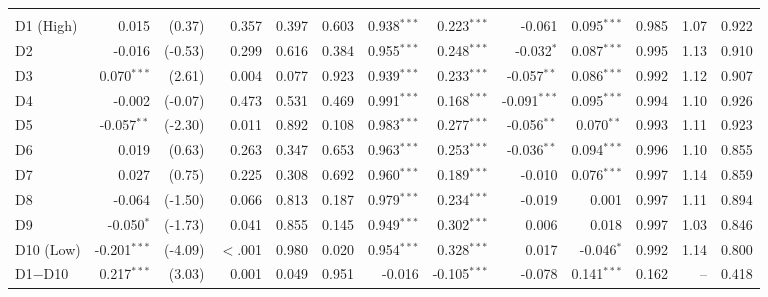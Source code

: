 {\begin{longtable}[t]{lrrrrrrrrrrrr}
\addlinespace[0.3em]
\hline
\multicolumn{13}{l}{\textit{Panel F: Cross-regime (cohorts 3, 4 span a boundary)}}\\
\hspace{1em}D1 (High) & 0.015 & (0.37) & 0.357 & 0.397 & 0.603 & 0.938$^{***}$ & 0.223$^{***}$ & -0.061 & 0.095$^{***}$ & 0.985 & 1.07 & 0.922\\
\hspace{1em}D2 & -0.016 & (-0.53) & 0.299 & 0.616 & 0.384 & 0.955$^{***}$ & 0.248$^{***}$ & -0.032$^{*}$ & 0.087$^{***}$ & 0.995 & 1.13 & 0.910\\
\hspace{1em}D3 & 0.070$^{***}$ & (2.61) & 0.004 & 0.077 & 0.923 & 0.939$^{***}$ & 0.233$^{***}$ & -0.057$^{**}$ & 0.086$^{***}$ & 0.992 & 1.12 & 0.907\\
\hspace{1em}D4 & -0.002 & (-0.07) & 0.473 & 0.531 & 0.469 & 0.991$^{***}$ & 0.168$^{***}$ & -0.091$^{***}$ & 0.095$^{***}$ & 0.994 & 1.10 & 0.926\\
\hspace{1em}D5 & -0.057$^{**}$ & (-2.30) & 0.011 & 0.892 & 0.108 & 0.983$^{***}$ & 0.277$^{***}$ & -0.056$^{**}$ & 0.070$^{**}$ & 0.993 & 1.11 & 0.923\\
\hspace{1em}D6 & 0.019 & (0.63) & 0.263 & 0.347 & 0.653 & 0.963$^{***}$ & 0.253$^{***}$ & -0.036$^{**}$ & 0.094$^{***}$ & 0.996 & 1.10 & 0.855\\
\hspace{1em}D7 & 0.027 & (0.75) & 0.225 & 0.308 & 0.692 & 0.960$^{***}$ & 0.189$^{***}$ & -0.010 & 0.076$^{***}$ & 0.997 & 1.14 & 0.859\\
\hspace{1em}D8 & -0.064 & (-1.50) & 0.066 & 0.813 & 0.187 & 0.979$^{***}$ & 0.234$^{***}$ & -0.019 & 0.001 & 0.997 & 1.11 & 0.894\\
\hspace{1em}D9 & -0.050$^{*}$ & (-1.73) & 0.041 & 0.855 & 0.145 & 0.949$^{***}$ & 0.302$^{***}$ & 0.006 & 0.018 & 0.997 & 1.03 & 0.846\\
\hspace{1em}D10 (Low) & -0.201$^{***}$ & (-4.09) & $<$.001 & 0.980 & 0.020 & 0.954$^{***}$ & 0.328$^{***}$ & 0.017 & -0.046$^{*}$ & 0.992 & 1.14 & 0.800\\
\hspace{1em}D1$-$D10 & 0.217$^{***}$ & (3.03) & 0.001 & 0.049 & 0.951 & -0.016 & -0.105$^{***}$ & -0.078 & 0.141$^{***}$ & 0.162 & -- & 0.418\\*
\end{longtable}
}
